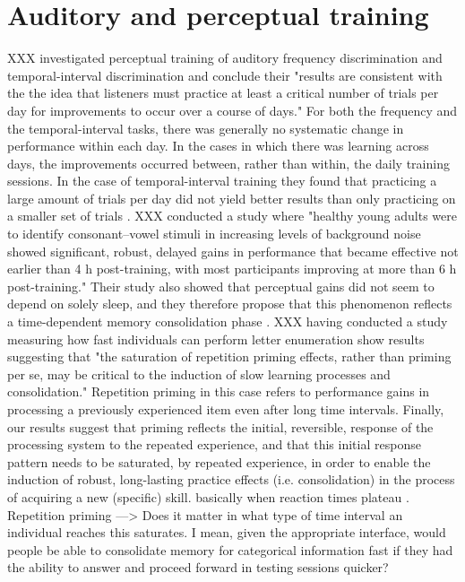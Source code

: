\section{Auditory and perceptual training}
XXX investigated perceptual training of auditory frequency discrimination and temporal-interval discrimination and conclude their "results are consistent with the the idea that listeners must practice at least a critical number of trials per day for improvements to occur over a course of days." For both the frequency and the temporal-interval tasks, there was generally no systematic change in performance within each day. In the cases in which there was learning across days, the improvements occurred between, rather than within, the daily training sessions. In the case of temporal-interval training they found that practicing a large amount of trials per day did not yield better results than only practicing on a smaller set of trials \cite{wright2007perceptual}.
XXX conducted a study where "healthy young adults were to identify consonant–vowel stimuli in increasing levels of background noise showed significant, robust, delayed gains in performance that became effective not earlier than 4 h post-training, with most participants improving at more than 6 h post-training." Their study also showed that perceptual gains did not seem to depend on solely sleep, and they therefore propose that this phenomenon reflects a time-dependent memory consolidation phase \cite{roth2005latent}.
XXX having conducted a study measuring how fast individuals can perform letter enumeration show results suggesting that "the saturation of repetition priming effects, rather than priming per se, may be critical to the induction of slow learning  processes and consolidation." Repetition priming in this case refers to performance gains in processing a previously experienced item even after long time intervals. Finally, our results suggest that priming reflects the initial, reversible, response of the processing system to the repeated experience, and that this initial response pattern needs to be saturated, by repeated experience, in order to enable the induction of robust, long-lasting practice effects (i.e. consolidation) in the process of acquiring a new (specific) skill. basically when reaction times plateau \cite{hauptmann2002primed}.
Repetition priming —> Does it matter in what type of time interval an individual reaches this saturates. I mean, given the appropriate interface, would people be able to consolidate memory for categorical information fast if they had the ability to answer and proceed forward in testing sessions quicker?

